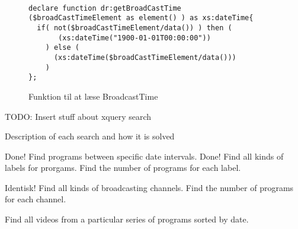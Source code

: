 \begin{figure}[ht]
\begin{lstlisting}[style=FAKE_XQUERY, language=XQUERY]

declare function dr:getBroadCastTime
($broadCastTimeElement as element() ) as xs:dateTime{
  if( not($broadCastTimeElement/data()) ) then (
       (xs:dateTime("1900-01-01T00:00:00"))
    ) else (
      (xs:dateTime($broadCastTimeElement/data()))
    ) 
};

\end{lstlisting}
\caption{Funktion til at læse BroadcastTime}
\label{xquerySearch:getBroadCastTime}
\end{figure}





TODO: Insert stuff about xquery search

Description of each search and how it is solved

Done! Find programs between specific date intervals.
Done! Find all kinds of labels for prorgams.
Find the number of programs for each label.

Identisk! Find all kinds of broadcasting channels.
Find the number of programs for each channel.

Find all videos from a particular series of programs sorted by date.



